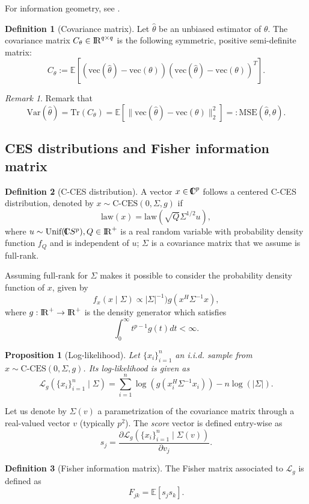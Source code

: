 \documentclass[10pt,a4paper]{book}
\theoremstyle{definition}
\newtheorem{defn}{Definition}[section]
\theoremstyle{plain}
\newtheorem{prop}{Proposition}[section]
\theoremstyle{remark}
\newtheorem{rmk}{Remark}[section]
\newcommand{\vecto}{\text{vec}}
\newcommand \Esp {\mathbb{E}}
\def\R{{\rm I\kern-0.16em R}}
\def\C{{\rm I\kern-0.46em C}}
\begin{document}
For information geometry, see \cite{amari2016information}. 

\begin{defn}[Covariance matrix]
Let $\hat{\theta}$ be an unbiased estimator of $\theta$. The covariance matrix $C_{\theta}\in \R^{q\times q}$ is the following symmetric, positive semi-definite matrix:
$$C_{\theta}:=\Esp\left[(\vecto(\hat{\theta})-\vecto(\theta))(\vecto(\hat{\theta})-\vecto(\theta))^T\right].$$
\end{defn}
\begin{rmk}
Remark that
$$\text{Var}(\hat{\theta})=\text{Tr}(C_{\theta})=\Esp\left[ \|\vecto(\hat{\theta})-\vecto(\theta)\|_2^2\right]=:\text{MSE}(\hat{\theta},\theta).$$
\end{rmk}

\subsection{CES distributions and Fisher information matrix}
\begin{defn}[C-CES distribution]
A vector $x\in \C^p$ follows a centered C-CES distribution, denoted by 
$x\sim \text{C-CES}(0,\Sigma,g)$ if 
$$\text{law}(x)=\text{law}(\sqrt{Q}\Sigma^{1/2}u),$$
where $u \sim \text{Unif}(\C S^{p}), Q\in \R^{+}$ is a real random variable with probability density function $f_{Q}$ and is independent of $u$; $\Sigma$ is a covariance matrix that we assume is full-rank.
\end{defn}
Assuming full-rank for $\Sigma$ makes it possible to consider the probability density function of $x$, given by
$$f_{x}(x\mid \Sigma) \propto |\Sigma|^{-1})g\left(x^{H}\Sigma^{-1}x\right),$$
where $g:\R^{+}\to \R^{+}$ is the density generator which satisfies 
$$\int_0^{\infty}t^{p-1}g(t)dt<\infty.$$
\begin{prop}[Log-likelihood]
Let $\{x_i\}_{i=1}^{n}$ an i.i.d. sample from $x\sim \text{C-CES}(0,\Sigma,g)$. Its log-likelihood is given as
$$\mathcal{L}_g(\{x_i\}_{i=1}^{n}\mid \Sigma)=\sum_{i=1}^{n}\log\left(g\left(x_i^{H}\Sigma^{-1}x_i\right)\right)-n\log(|\Sigma|).$$
\end{prop}
Let us denote by $\Sigma(v)$ a parametrization of the covariance matrix through a real-valued vector $v$ (typically $p^2$). 
The \emph{score} vector is defined entry-wise as
$$s_{j}=\frac{\partial \mathcal{L}_g\left(\{x_i\}_{i=1}^{n}\mid \Sigma(v)\right)}{\partial v_j}.$$
\begin{defn}[Fisher information matrix]
The Fisher matrix associated to $\mathcal{L}_g$ is defined as
$$F_{jk}=\Esp\left[s_j s_k\right].$$
\end{defn}
\end{document}
